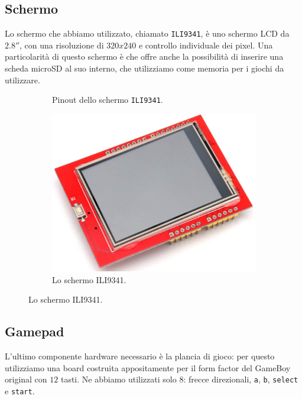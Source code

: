 \documentclass[hidelinks,12pt]{article}
\begin{document}
\subsection{Schermo}
Lo schermo che abbiamo utilizzato, chiamato \texttt{ILI9341}, è uno schermo LCD
da $2.8''$, con una risoluzione di $320x240$ e controllo individuale dei pixel.
Una particolarità di questo schermo è che offre anche la possibilità di inserire
una scheda microSD al suo interno, che utilizziamo come memoria per i giochi da
utilizzare.
\begin{figure}[h]
	\begin{subfigure}[b]{0.45\textwidth}
		\begin{center}
			\begin{tikzpicture}[x=0.015cm, y=0.015cm, scale=0.5, transform shape]
				
			\end{tikzpicture}
		\end{center}
		\caption{Pinout dello schermo \texttt{ILI9341}.}
		\label{fig:pinout_ili}

	\end{subfigure}
	\hfill
	\begin{subfigure}[b]{0.45\textwidth}
		\begin{center}
			\includegraphics[scale=0.4]{figures/ili.png}
		\end{center}
		\caption{Lo schermo ILI9341.}
		\label{fig:ili9341}
	\end{subfigure}
\end{figure}


\subsection{Gamepad}
L'ultimo componente hardware necessario è la plancia di gioco: per questo
utilizziamo una board costruita appositamente per il form factor del GameBoy
original con $12$ tasti. Ne abbiamo utilizzati solo $8$: frecce direzionali,
\texttt{a}, \texttt{b}, \texttt{select} e \texttt{start}.
\end{document}
